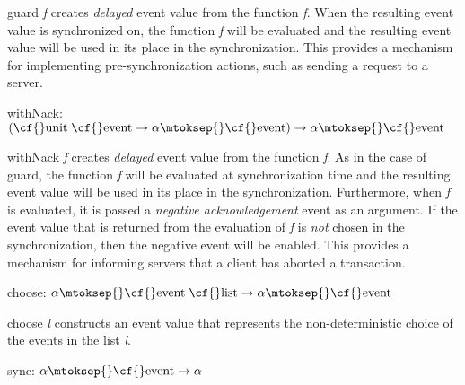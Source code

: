 \begin{descr}
\begin{speccomment}
\item {\cf \small guard \mbox{\cf \small \textit{f}}           } 
creates \textit{delayed} event value from the function \mbox{\cf \small \textit{f}}. 	  When the resulting event value is synchronized on, the function 	  \mbox{\cf \small \textit{f}} will be evaluated and the resulting event value will be 	  used in its place in the synchronization. 	  This provides a mechanism for implementing pre-synchronization 	  actions, such as sending a request to a server.     \end{speccomment}
\item {}{} {\cf withNack: \((\mbox{\cf{}unit}\;\mbox{\cf{}event}\rightarrow \alpha\mtoksep{}\mbox{\cf{}event})\rightarrow \alpha\mtoksep{}\mbox{\cf{}event}\)}\label{val-CML.withNack}


\begin{speccomment}
\item {\cf \small with\-Nack \mbox{\cf \small \textit{f}}           } 
creates \textit{delayed} event value from the function \mbox{\cf \small \textit{f}}. 	  As in the case of {\cf \small guard}, the function \mbox{\cf \small \textit{f}} will be evaluated 	  at synchronization time and the resulting event value will be 	  used in its place in the synchronization. 	  Furthermore, when \mbox{\cf \small \textit{f}} is evaluated, it is passed a \textit{negative 	  acknowledgement} event as an argument. 	  If the event value that is returned from the evaluation of \mbox{\cf \small \textit{f}} 	  is \emph{not} chosen in the synchronization, then the negative 	  event will be enabled. 	  This provides a mechanism for informing servers that a client has 	  aborted a transaction.     \end{speccomment}
\item {}{} {\cf choose: \(\alpha\mtoksep{}\mbox{\cf{}event}\;\mbox{\cf{}list}\rightarrow \alpha\mtoksep{}\mbox{\cf{}event}\)}\label{val-CML.choose}


\begin{speccomment}
\item {\cf \small choose \mbox{\cf \small \textit{l}}           } 
constructs an event value that represents the non-deterministic 	  choice of the events in the list \mbox{\cf \small \textit{l}}.     \end{speccomment}
\item {}{} {\cf sync: \(\alpha\mtoksep{}\mbox{\cf{}event}\rightarrow \alpha\)}\label{val-CML.sync}



\end{descr}

